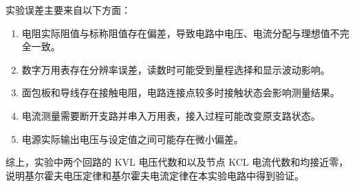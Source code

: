 实验误差主要来自以下方面：
\begin{enumerate}[label=\arabic*.]
    \item 电阻实际阻值与标称阻值存在偏差，导致电路中电压、电流分配与理想值不完全一致。
    \item 数字万用表存在分辨率误差，读数时可能受到量程选择和显示波动影响。
    \item 面包板和导线存在接触电阻，电路连接点较多时接触状态会影响测量结果。
    \item 电流测量需要断开支路并串入万用表，接入过程可能改变原支路状态。
    \item 电源实际输出电压与设定值之间可能存在微小偏差。
\end{enumerate}

综上，实验中两个回路的 KVL 电压代数和以及节点 KCL 电流代数和均接近零，说明基尔霍夫电压定律和基尔霍夫电流定律在本实验电路中得到验证。

